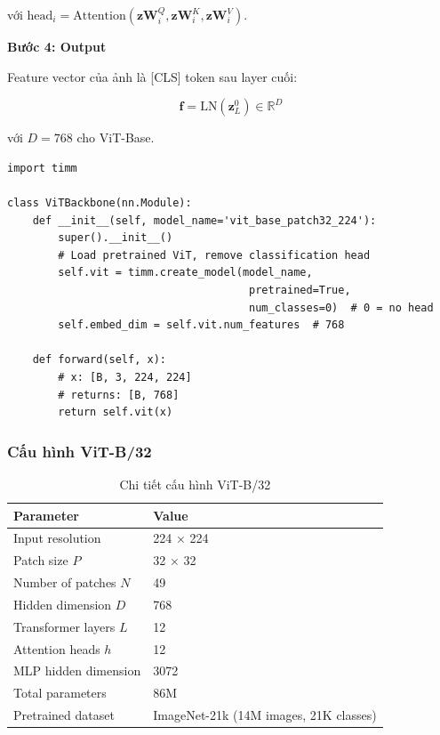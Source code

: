 \documentclass[12pt,a4paper]{article}
\begin{document}
với $\text{head}_i = \text{Attention}(\mathbf{z}\mathbf{W}_i^Q, \mathbf{z}\mathbf{W}_i^K, \mathbf{z}\mathbf{W}_i^V)$.

\textbf{Bước 4: Output}

Feature vector của ảnh là [CLS] token sau layer cuối:

\begin{equation}
    \mathbf{f} = \text{LN}(\mathbf{z}_L^0) \in \mathbb{R}^{D}
\end{equation}

với $D = 768$ cho ViT-Base.

\begin{lstlisting}[caption={ViT Feature Extraction trong PyTorch}]
import timm

class ViTBackbone(nn.Module):
    def __init__(self, model_name='vit_base_patch32_224'):
        super().__init__()
        # Load pretrained ViT, remove classification head
        self.vit = timm.create_model(model_name, 
                                      pretrained=True, 
                                      num_classes=0)  # 0 = no head
        self.embed_dim = self.vit.num_features  # 768
    
    def forward(self, x):
        # x: [B, 3, 224, 224]
        # returns: [B, 768]
        return self.vit(x)
\end{lstlisting}

\subsubsection{Cấu hình ViT-B/32}

\begin{table}[H]
\centering
\caption{Chi tiết cấu hình ViT-B/32}
\label{tab:vit_config}
\begin{tabular}{ll}
\toprule
\textbf{Parameter} & \textbf{Value} \\
\midrule
Input resolution & 224 × 224 \\
Patch size $P$ & 32 × 32 \\
Number of patches $N$ & 49 \\
Hidden dimension $D$ & 768 \\
Transformer layers $L$ & 12 \\
Attention heads $h$ & 12 \\
MLP hidden dimension & 3072 \\
Total parameters & 86M \\
Pretrained dataset & ImageNet-21k (14M images, 21K classes) \\
\bottomrule
\end{tabular}
\end{table}
\end{document}
